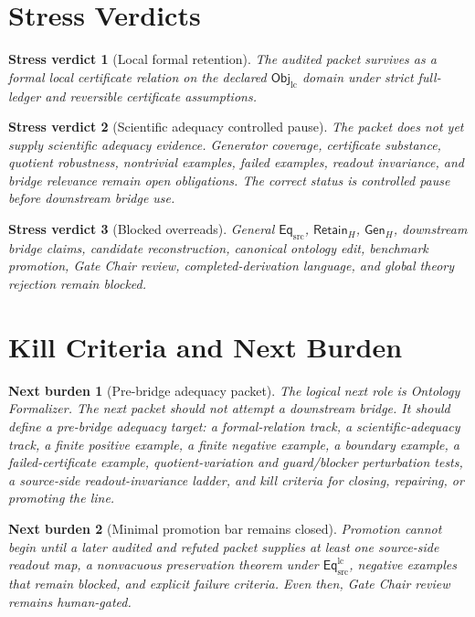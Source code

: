 \documentclass[11pt]{article}
\newcommand{\EqSrc}{\mathsf{Eq}_{\mathrm{src}}}
\newcommand{\EqLC}{\mathsf{Eq}_{\mathrm{src}}^{\mathrm{lc}}}
\newcommand{\ObjLC}{\mathsf{Obj}_{\mathrm{lc}}}
\newcommand{\RetainH}{\mathsf{Retain}_{H}}
\newcommand{\GenH}{\mathsf{Gen}_{H}}
\newtheorem{verdict}{Stress verdict}
\newtheorem{nextburden}{Next burden}
\begin{document}
\section{Stress Verdicts}

\begin{verdict}[Local formal retention]
The audited packet survives as a formal local certificate relation on
the declared \(\ObjLC\) domain under strict full-ledger and reversible
certificate assumptions.
\end{verdict}

\begin{verdict}[Scientific adequacy controlled pause]
The packet does not yet supply scientific adequacy evidence. Generator
coverage, certificate substance, quotient robustness, nontrivial
examples, failed examples, readout invariance, and bridge relevance
remain open obligations. The correct status is controlled pause before
downstream bridge use.
\end{verdict}

\begin{verdict}[Blocked overreads]
General \(\EqSrc\), \(\RetainH\), \(\GenH\), downstream bridge claims,
candidate reconstruction, canonical ontology edit, benchmark promotion,
Gate Chair review, completed-derivation language, and global theory
rejection remain blocked.
\end{verdict}

\section{Kill Criteria and Next Burden}

\begin{nextburden}[Pre-bridge adequacy packet]
The logical next role is Ontology Formalizer. The next packet should not
attempt a downstream bridge. It should define a pre-bridge adequacy
target: a formal-relation track, a scientific-adequacy track, a finite
positive example, a finite negative example, a boundary example, a
failed-certificate example, quotient-variation and guard/blocker
perturbation tests, a source-side readout-invariance ladder, and kill
criteria for closing, repairing, or promoting the line.
\end{nextburden}

\begin{nextburden}[Minimal promotion bar remains closed]
Promotion cannot begin until a later audited and refuted packet supplies
at least one source-side readout map, a nonvacuous preservation theorem
under \(\EqLC\), negative examples that remain blocked, and explicit
failure criteria. Even then, Gate Chair review remains human-gated.
\end{nextburden}
\end{document}
